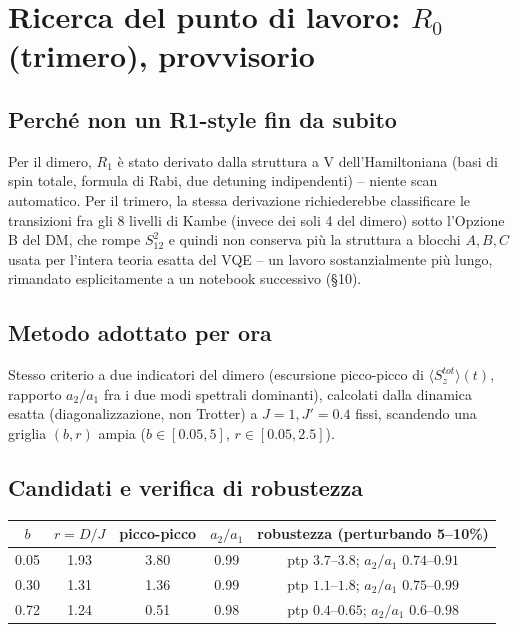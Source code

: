 \documentclass[11pt,a4paper]{article}
\begin{document}
\section{Ricerca del punto di lavoro: $R_0$ (trimero), provvisorio}

\subsection{Perché non un R1-style fin da subito}

Per il dimero, $R_1$ è stato derivato dalla struttura a V
dell'Hamiltoniana (basi di spin totale, formula di Rabi, due detuning
indipendenti) -- niente scan automatico. Per il trimero, la stessa
derivazione richiederebbe classificare le transizioni fra gli 8 livelli
di Kambe (invece dei soli 4 del dimero) sotto l'Opzione B del DM, che rompe
$S_{12}^2$ e quindi non conserva più la struttura a blocchi $A,B,C$ usata
per l'intera teoria esatta del VQE -- un lavoro sostanzialmente più lungo,
rimandato esplicitamente a un notebook successivo (\S10).

\subsection{Metodo adottato per ora}

Stesso criterio a due indicatori del dimero (escursione picco-picco di
$\langle S_z^{tot}\rangle(t)$, rapporto $a_2/a_1$ fra i due modi
spettrali dominanti), calcolati dalla dinamica esatta (diagonalizzazione,
non Trotter) a $J=1,J'=0.4$ fissi, scandendo una griglia $(b,r)$ ampia
($b\in[0.05,5]$, $r\in[0.05,2.5]$).

\subsection{Candidati e verifica di robustezza}

\begin{center}
\begin{tabular}{@{}ccccc@{}}
\toprule
$b$ & $r=D/J$ & picco-picco & $a_2/a_1$ & robustezza (perturbando 5--10\%) \\
\midrule
0.05 & 1.93 & 3.80 & 0.99 & ptp $3.7$--$3.8$; $a_2/a_1$ $0.74$--$0.91$ \\
0.30 & 1.31 & 1.36 & 0.99 & ptp $1.1$--$1.8$; $a_2/a_1$ $0.75$--$0.99$ \\
0.72 & 1.24 & 0.51 & 0.98 & ptp $0.4$--$0.65$; $a_2/a_1$ $0.6$--$0.98$ \\
\bottomrule
\end{tabular}
\end{center}
\end{document}
